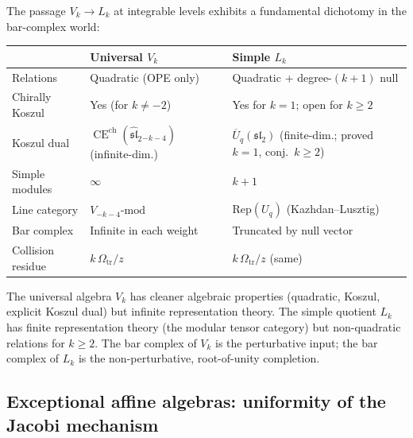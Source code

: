 \begin{remark}
\label{rem:universal-vs-simple-dichotomy}
The passage $V_k \to L_k$ at integrable levels exhibits a
fundamental dichotomy in the bar-complex world:
\begin{center}
\renewcommand{\arraystretch}{1.3}
\small
\begin{tabular}{lll}
& \textbf{Universal $V_k$} & \textbf{Simple $L_k$} \\
\hline
Relations & Quadratic (OPE only) & Quadratic + degree-$(k{+}1)$
 null \\
Chirally Koszul & Yes (for $k \ne -2$) & Yes for $k = 1$;
 open for $k \ge 2$ \\
Koszul dual & $\operatorname{CE}^{\mathrm{ch}}(\widehat{\mathfrak{sl}}_2{}_{-k-4})$ (infinite-dim.)
 & $\overline{U}_q(\mathfrak{sl}_2)$
 (finite-dim.; proved $k{=}1$, conj.\ $k{\ge}2$) \\
Simple modules & $\infty$ & $k + 1$ \\
Line category & $V_{-k-4}\text{-mod}$ & $\mathrm{Rep}(U_q)$
 (Kazhdan--Lusztig) \\
Bar complex & Infinite in each weight & Truncated by null vector \\
Collision residue & $k\,\Omega_{\mathrm{tr}}/z$ & $k\,\Omega_{\mathrm{tr}}/z$ (same) \\
\end{tabular}
\end{center}
The universal algebra $V_k$ has cleaner algebraic properties
(quadratic, Koszul, explicit Koszul dual) but infinite
representation theory. The simple quotient $L_k$ has finite
representation theory (the modular tensor category) but
non-quadratic relations for $k \ge 2$. The bar complex of
$V_k$ is the perturbative input; the bar complex of $L_k$ is
the non-perturbative, root-of-unity completion.
\end{remark}


%
%

\subsection{Exceptional affine algebras: uniformity of the Jacobi mechanism}
\label{subsec:exceptional-affine}

